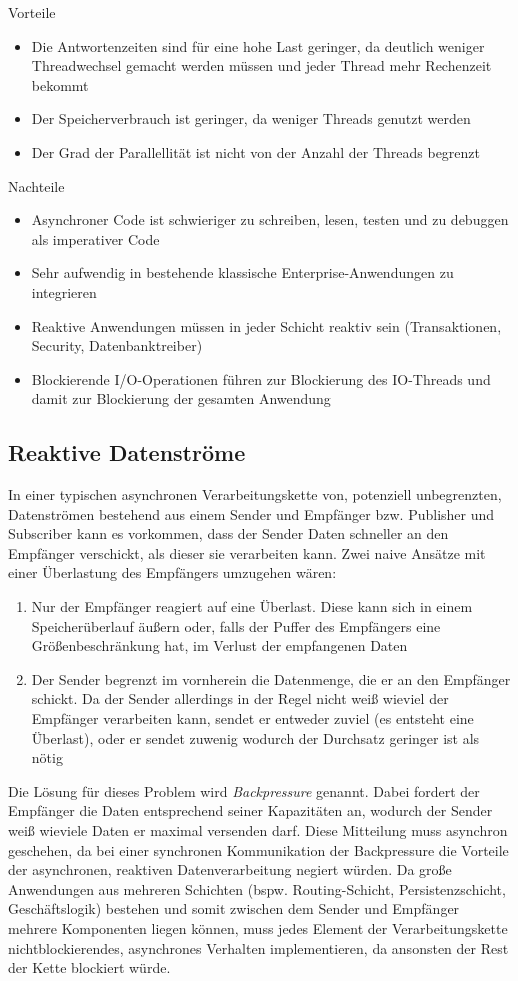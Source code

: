 Vorteile
\begin{itemize}
	\item Die Antwortenzeiten sind für eine hohe Last geringer, da deutlich weniger Threadwechsel gemacht werden müssen und jeder Thread
	      mehr Rechenzeit bekommt
	\item Der Speicherverbrauch ist geringer, da weniger Threads genutzt werden
	\item Der Grad der Parallellität ist nicht von der Anzahl der Threads begrenzt
\end{itemize}
Nachteile
\begin{itemize}
	\item Asynchroner Code ist schwieriger zu schreiben, lesen, testen und zu debuggen als imperativer Code
	\item Sehr aufwendig in bestehende klassische Enterprise-Anwendungen zu integrieren
	\item Reaktive Anwendungen müssen in jeder Schicht reaktiv sein (Transaktionen, Security, Datenbanktreiber)
	\item Blockierende I/O-Operationen führen zur Blockierung des IO-Threads und damit zur Blockierung der gesamten Anwendung
\end{itemize}

\subsection{Reaktive Datenströme}
\label{section:reaktive_datenströme}
In einer typischen asynchronen Verarbeitungskette von, potenziell unbegrenzten, Datenströmen
bestehend aus einem Sender und Empfänger bzw. Publisher und Subscriber kann es vorkommen,
dass der Sender Daten schneller an den Empfänger verschickt, als dieser sie verarbeiten kann.
Zwei naive Ansätze mit einer Überlastung des Empfängers umzugehen wären:
\begin{enumerate}
	\item Nur der Empfänger reagiert auf eine Überlast. Diese kann sich in einem Speicherüberlauf äußern oder, falls der Puffer des Empfängers eine Größenbeschränkung
	      hat, im Verlust der empfangenen Daten
	\item Der Sender begrenzt im vornherein die Datenmenge, die er an den Empfänger schickt. Da der Sender allerdings in der Regel nicht weiß wieviel der Empfänger
	      verarbeiten kann, sendet er entweder zuviel (es entsteht eine Überlast), oder er sendet zuwenig wodurch der Durchsatz geringer ist als nötig
\end{enumerate}\parencite{JavaSpektrum2015}
Die Lösung für dieses Problem wird \textit{Backpressure} genannt.
Dabei fordert der Empfänger die Daten entsprechend seiner Kapazitäten an, wodurch der Sender weiß wieviele Daten er maximal versenden darf.
Diese Mitteilung muss asynchron geschehen, da bei einer synchronen Kommunikation der Backpressure die Vorteile der asynchronen, reaktiven Datenverarbeitung
negiert würden.
Da große Anwendungen aus mehreren Schichten (bspw. Routing-Schicht, Persistenzschicht, Geschäftslogik) bestehen und somit zwischen
dem Sender und Empfänger mehrere Komponenten liegen können, muss jedes
Element der Verarbeitungskette nichtblockierendes, asynchrones Verhalten implementieren, da ansonsten der Rest der Kette blockiert würde.

